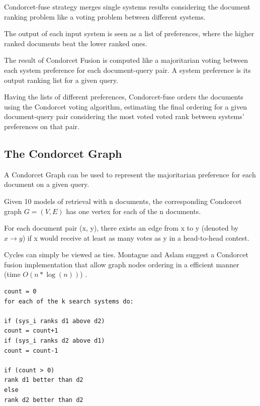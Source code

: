 Condorcet-fuse strategy merges single systems results considering the document ranking problem like a voting problem between different systems. 


The output of each input system is seen as a list of preferences, where the higher ranked documents beat the lower ranked ones.

The result of Condorcet Fusion is computed like a majoritarian voting between each system preference for each document-query pair. 
A system preference is its output ranking list for a given query.  


Having the lists of different preferences, Condorcet-fuse orders the documents using the Condorcet voting algorithm, estimating the final ordering for a given document-query pair considering the most voted 
voted rank between systems' preferences on that pair. 


\subsection{The Condorcet Graph}

A Condorcet Graph can be used to represent the majoritarian preference for each document on a given query. 

Given 10 models of retrieval with n documents, the corresponding
Condorcet graph $G = (V, E)$ has one vertex for each of the n documents.

For each document pair (x, y), there exists an edge from x to
y (denoted by $x \rightarrow y$) if x would receive at least as many votes as y in a head-to-head contest.

Cycles can simply be viewed as ties.
Montague and Aslam \cite{3} suggest a Condorcet fusion implementation that allow graph nodes ordering in a efficient manner (time $O(n*\log(n))$) .  

	\begin{lstlisting}
count = 0
for each of the k search systems do:

if (sys_i ranks d1 above d2)
count = count+1 
if (sys_i ranks d2 above d1)
count = count-1 

if (count > 0)
rank d1 better than d2
else 
rank d2 better than d2 

\end{lstlisting}

